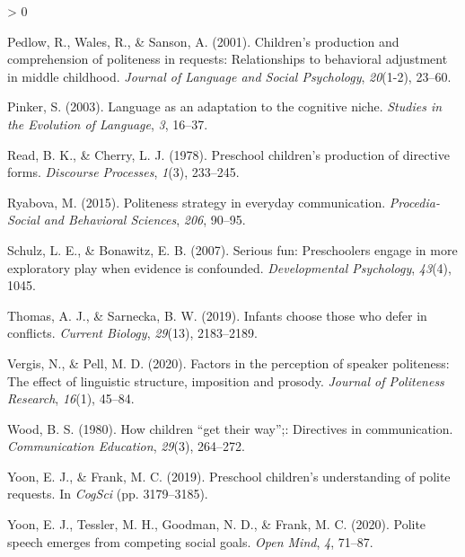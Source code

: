 \documentclass[
  english,
  man,floatsintext]{apa6}
\newlength{\cslhangindent}
\newenvironment{CSLReferences}[2] %
 {%
  \setlength{\parindent}{0pt}
  \ifodd #1 \everypar{\setlength{\hangindent}{\cslhangindent}}\ignorespaces\fi
  \ifnum #2 > 0
  \setlength{\parskip}{#2\baselineskip}
  \fi
 }%
 {}
\begin{document}
\begin{CSLReferences}{1}{0}
\leavevmode\hypertarget{ref-pedlow2001}{}%
Pedlow, R., Wales, R., \& Sanson, A. (2001). Children's production and comprehension of politeness in requests: Relationships to behavioral adjustment in middle childhood. \emph{Journal of Language and Social Psychology}, \emph{20}(1-2), 23--60.

\leavevmode\hypertarget{ref-pinker2003}{}%
Pinker, S. (2003). Language as an adaptation to the cognitive niche. \emph{Studies in the Evolution of Language}, \emph{3}, 16--37.

\leavevmode\hypertarget{ref-read1978}{}%
Read, B. K., \& Cherry, L. J. (1978). Preschool children's production of directive forms. \emph{Discourse Processes}, \emph{1}(3), 233--245.

\leavevmode\hypertarget{ref-ryabova2015}{}%
Ryabova, M. (2015). Politeness strategy in everyday communication. \emph{Procedia-Social and Behavioral Sciences}, \emph{206}, 90--95.

\leavevmode\hypertarget{ref-schulz2007}{}%
Schulz, L. E., \& Bonawitz, E. B. (2007). Serious fun: Preschoolers engage in more exploratory play when evidence is confounded. \emph{Developmental Psychology}, \emph{43}(4), 1045.

\leavevmode\hypertarget{ref-thomas2019}{}%
Thomas, A. J., \& Sarnecka, B. W. (2019). Infants choose those who defer in conflicts. \emph{Current Biology}, \emph{29}(13), 2183--2189.

\leavevmode\hypertarget{ref-vergis2020}{}%
Vergis, N., \& Pell, M. D. (2020). Factors in the perception of speaker politeness: The effect of linguistic structure, imposition and prosody. \emph{Journal of Politeness Research}, \emph{16}(1), 45--84.

\leavevmode\hypertarget{ref-wood1980}{}%
Wood, B. S. (1980). How children {``get their way''};: Directives in communication. \emph{Communication Education}, \emph{29}(3), 264--272.

\leavevmode\hypertarget{ref-yoon2019}{}%
Yoon, E. J., \& Frank, M. C. (2019). Preschool children's understanding of polite requests. In \emph{CogSci} (pp. 3179--3185).

\leavevmode\hypertarget{ref-yoon2020}{}%
Yoon, E. J., Tessler, M. H., Goodman, N. D., \& Frank, M. C. (2020). Polite speech emerges from competing social goals. \emph{Open Mind}, \emph{4}, 71--87.

\end{CSLReferences}

\endgroup
\end{document}

